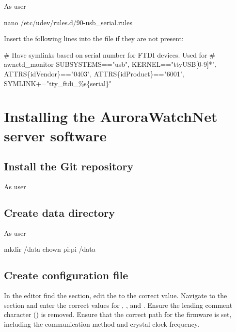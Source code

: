 As user \rootUser
\begin{Cmd}
nano /etc/udev/rules.d/90-usb_serial.rules
\end{Cmd}

Insert the following lines into the file if they are not present:
\begin{Cmd}[fontsize=\relsize{-3}]
# Have symlinks based on serial number for FTDI devices. Used for 
# awnetd_monitor
SUBSYSTEMS=="usb", KERNEL=="ttyUSB[0-9]*", ATTRS\{idVendor\}=="0403", ATTRS\{idProduct\}=="6001", SYMLINK+="tty_ftdi_\%s\{serial\}"  
\end{Cmd}

\section{Installing the AuroraWatchNet server software}

\subsection{Install the Git repository}
As user \piUser



\subsection{Create data directory}
As user \rootUser
\begin{Cmd}
mkdir /data
chown pi:pi /data
\end{Cmd}

\subsection{Create configuration file}

\ifdef{\caluniumMagManual}{%
}{}
\ifdef{\raspiMagManual}{%
}{}
\ifdef{\bgsMagManual}{%
}{}
\ifdef{\riometerManual}{%
}{}

In the editor find the \code{[DEFAULT]} section, edit the 
to the correct value. Navigate to the \code{[upload]} section and
enter the correct values for , ,
 and . Ensure the leading comment character
(\code{\#}) is removed.  Ensure that the correct path for the firmware
is set, including the communication method and crystal clock frequency.

